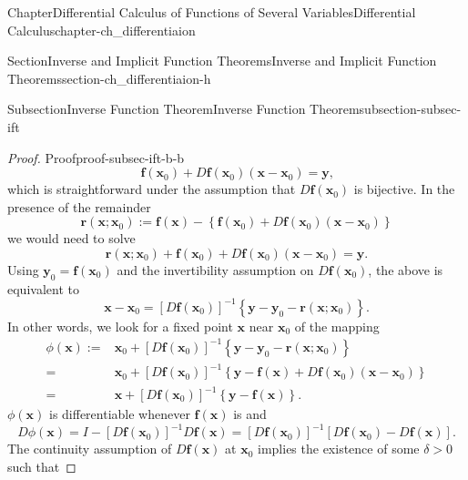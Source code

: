 \documentclass[oneside,10pt,]{book}
\numberwithin{equation}{section}
\newcommand{\amp}{&}
\begin{document}
\begin{chapterptx}{Chapter}{Differential Calculus of Functions of Several Variables}{}{Differential Calculus}{}{}{chapter-ch_differentiaion}
\begin{sectionptx}{Section}{Inverse and Implicit Function Theorems}{}{Inverse and Implicit Function Theorems}{}{}{section-ch_differentiaion-h}
\begin{subsectionptx}{Subsection}{Inverse Function Theorem}{}{Inverse Function Theorem}{}{}{subsection-subsec-ift}
\begin{proof}{Proof}{}{proof-subsec-ift-b-b}
\begin{equation*}
{\mathbf f}({\mathbf x}_{0})+D{\mathbf f}({\mathbf x}_{0})({\mathbf x}-{\mathbf x}_{0})=
{\mathbf y}\text{,}
\end{equation*}
which is straightforward under the assumption that \(D{\mathbf f}({\mathbf x}_{0})\) is bijective. In the presence of the remainder%
\begin{equation*}
{\mathbf r}({\mathbf x}; {\mathbf x}_{0}) := {\mathbf f}({\mathbf x})
-\left\{ {\mathbf f}({\mathbf x}_{0})+D{\mathbf f}({\mathbf x}_{0})({\mathbf x}-{\mathbf x}_{0}) \right\}
\end{equation*}
we would need to solve%
\begin{equation}
{\mathbf r}({\mathbf x}; {\mathbf x}_{0})+ {\mathbf f}({\mathbf x}_{0}) +
D{\mathbf f}({\mathbf x}_{0})({\mathbf x}-{\mathbf x}_{0})= {\mathbf y} .\label{men-remain}
\end{equation}
Using \({\mathbf y}_{0}={\mathbf f}({\mathbf x}_{0})\) and the invertibility assumption on \(D{\mathbf f}({\mathbf x}_{0})\), the above is equivalent to%
\begin{equation*}
{\mathbf x}-{\mathbf x}_{0}= 
\left[D{\mathbf f}({\mathbf x}_{0})\right]^{-1}\left\{ {\mathbf y}-
{\mathbf y}_{0}-{\mathbf r}({\mathbf x}; {\mathbf x}_{0})\right\}.
\end{equation*}
In other words, we look for a fixed point \({\mathbf x}\) near \({\mathbf x}_{0}\) of the mapping%
\begin{align*}
\phi ({\mathbf x}) := \amp {\mathbf x}_{0} + \left[D{\mathbf f}({\mathbf x}_{0})\right]^{-1}\left\{ {\mathbf y}-
{\mathbf y}_{0}-{\mathbf r}({\mathbf x}; {\mathbf x}_{0})\right\}\\
=\amp {\mathbf x}_{0} + \left[D{\mathbf f}({\mathbf x}_{0})\right]^{-1}\left\{ {\mathbf y}- 
{\mathbf f}({\mathbf x}) + D{\mathbf f}({\mathbf x}_{0})({\mathbf x}-{\mathbf x}_{0}) \right\}\\
=\amp {\mathbf x}+ \left[D{\mathbf f}({\mathbf x}_{0})\right]^{-1}\left\{ {\mathbf y}- {\mathbf f}({\mathbf x}) \right\}.
\end{align*}
\(\phi ({\mathbf x})\) is differentiable whenever \({\mathbf f}({\mathbf x})\) is and%
\begin{equation*}
D\phi ({\mathbf x})= I - \left[D{\mathbf f}({\mathbf x}_{0})\right]^{-1}D {\mathbf f}({\mathbf x})
=\left[D{\mathbf f}({\mathbf x}_{0})\right]^{-1}\left[ D{\mathbf f}({\mathbf x}_{0})- D {\mathbf f}({\mathbf x})\right].
\end{equation*}
The continuity assumption of \(D {\mathbf f}({\mathbf x})\) at \({\mathbf x}_{0}\) implies the existence of some \(\delta >0\) such that%

\end{proof}
\end{subsectionptx}
\end{sectionptx}
\end{chapterptx}
\end{document}
